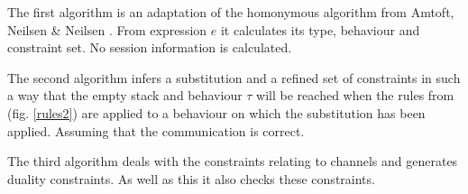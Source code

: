 The first algorithm is an adaptation of the homonymous algorithm from Amtoft, Neilsen \& Neilsen \cite{amtoft}. From expression $e$ it calculates its type, behaviour and constraint set. No session information is calculated. 

The second algorithm infers a substitution and a refined set of constraints in such a way that the empty stack and behaviour $\tau$ will be reached when the rules from (fig. \ref{rules2}) are applied to a behaviour on which the substitution has been applied. Assuming that the communication is correct. 

The third algorithm deals with the constraints relating to channels and generates duality constraints. As well as this it also checks these constraints. 